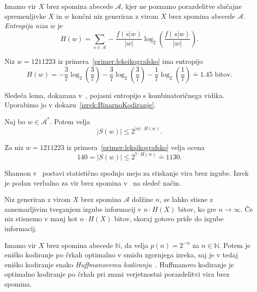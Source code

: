 \documentclass[fin1, tisk]{fmfdelo}
\providecommand{\abs}[1]{\left\lvert #1 \right\rvert}
\newcommand{\N}{\mathbb{N}}
\newcommand{\A}{\mathcal{A}}
\theoremstyle{definition}
\begin{document}
\begin{definicija}
    Imamo vir $X$ brez spomina abecede $\A$, kjer ne poznamo porazdelitve slučajne spremenljivke
    $X$ in $w$ končni niz generiran z virom $X$ brez spomina abecede $\A$.
    \emph{Entropija niza $w$} je
    \[
        H(w) = \sum_{s \in \A} - \frac{f(s|w)}{\abs{w}} 
        \log_2 \left( \frac{f(s|w)}{\abs{w}} \right).
    \]
\end{definicija}

\begin{primer}\label{primer:EntropijaNiza}
    Niz $w =1211223$ iz primera~\ref{primer:leksikografsko} ima entropijo
    \[
        H(w) = 
        - \frac{3}{7} \log_2 \left( \frac{3}{7} \right)
        - \frac{3}{7} \log_2 \left( \frac{3}{7} \right)
        - \frac{1}{7} \log_2 \left( \frac{1}{7} \right)
        \doteq 1.45 \text{ bitov}.
    \]
\end{primer}

Sledeča lema, dokazana v~\cite[Lema 2.3]{CsiszarKorner2011}, pojasni entropijo s 
kombinatoričnega vidika. Uporabimo jo v dokazu~\ref{izrek:BinarnoKodiranje}.

\begin{lema}\label{lema:ocena}
    Naj bo $w \in \A^*$. Potem velja 
    \[
        \abs{S(w)} \leq 2^{\abs{w} \cdot H(w)}.
    \] 
\end{lema}

\begin{primer}
    Za niz $w =1211223$ iz primera~\ref{primer:leksikografsko} velja ocena
    \[
        140 = \abs{S(w)} \leq 2^{7 \cdot H(w)} \doteq 1130.
    \]
\end{primer}

Shannon v~\cite{Shannon1949} postavi statistično spodnjo mejo za stiskanje
vira brez izgube. Izrek je podan verbalno za vir brez spomina 
v~\cite[1. poglavje, 4. razdelek]{Mackay2003} na sledeč način.

\begin{izrek}\label{izrek:EntropijaKodiranje}
    Niz generiran z virom $X$ brez spomina $\A$ dolžine $n$, se lahko stisne z 
    zanemarljivim tveganjem izgube informacij v $n \cdot H(X)$ bitov, ko gre $n \to \infty$. 
    Če niz stisnemo v manj kot $n \cdot H(X)$ bitov, skoraj gotovo pride do izgube informacij.
\end{izrek}

\begin{primer}
    Imamo vir $X$ brez spomina abecede $\N$, da velja $p(n) = 2^{-n}$ za $n \in \N$. 
    Potem je eniško kodiranje po črkah optimalno v smislu zgornjega izreka, saj je v 
    tedaj eniško kodiranje enako \emph{Huffmanovemu kodiranju}~\cite{Huffman1952}.
    Huffmanovo kodiranje je optimalno kodiranje po črkah pri znani verjetnostni porazdelitvi 
    vira brez spomina.
\end{primer}
\end{document}
